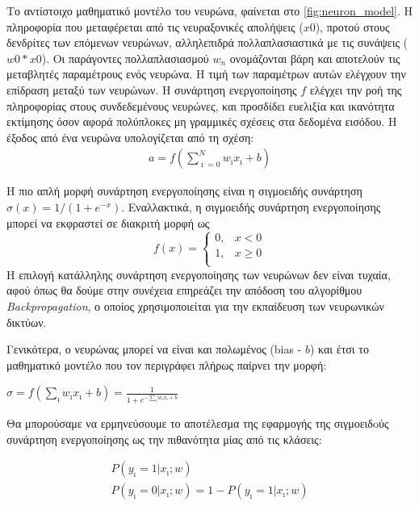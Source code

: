 Το αντίστοιχο μαθηματικό μοντέλο του νευρώνα, φαίνεται στο \autoref{fig:neuron_model}.
Η πληροφορία που μεταφέρεται από τις νευραξονικές απολήψεις ($x0$), προτού
στους δενδρίτες των επόμενων νευρώνων, αλληλεπιδρά πολλαπλασιαστικά με τις
συνάψεις ($w0*x0$). Οι παράγοντες πολλαπλασιασμού $w_n$ ονομάζονται βάρη
και αποτελούν τις μεταβλητές παραμέτρους ενός νευρώνα. Η τιμή των παραμέτρων
αυτών ελέγχουν την επίδραση μεταξύ των νευρώνων. Η συνάρτηση ενεργοποίησης $f$
ελέγχει την ροή της πληροφορίας στους συνδεδεμένους νευρώνες,
και προσδίδει ευελιξία και ικανότητα εκτίμησης όσον αφορά πολύπλοκες μη γραμμικές
σχέσεις στα δεδομένα εισόδου. Η έξοδος από ένα νευρώνα υπολογίζεται από τη σχέση:
\begin{gather*}
  a = f(\sum_{\imath=0}^{N}w_{\imath}x_{\imath} + b)
\end{gather*}

Η πιο απλή μορφή συνάρτηση ενεργοποίησης
είναι η σιγμοειδής συνάρτηση $\sigma(x) = 1 / (1 + e^{-x})$.
Εναλλακτικά, η σιγμοειδής συνάρτηση ενεργοποίησης μπορεί να εκφραστεί σε διακριτή μορφή ως
\[
f(x) =
  \begin{cases}
    0, & x < 0 \\
    1, & x \geq 0 \\
  \end{cases}
\]
Η επιλογή κατάλληλης συνάρτηση ενεργοποίησης των
νευρώνων δεν είναι τυχαία, αφού όπως θα δούμε στην
συνέχεια επηρεάζει την απόδοση του αλγορίθμου \emph{Backpropagation}, ο οποίος
χρησιμοποιείται για την εκπαίδευση των νευρωνικών δικτύων.

Γενικότερα, ο νευρώνας μπορεί να είναι και πολωμένος (bias - $b$) και έτσι το μαθηματικό
μοντέλο που τον περιγράφει πλήρως παίρνει την μορφή:
\begin{center}
\begin{large}
  $\sigma = f(\sum_{\imath}w_{\imath}x_{\imath} + b) = \frac{1}{1 + e^{-\sum_{\imath}w_{\imath}x_{\imath} + b}}$
\end{large}
\end{center}
Θα μπορούσαμε να ερμηνεύσουμε το αποτέλεσμα της εφαρμογής της
σιγμοειδoύς συνάρτηση ενεργοποίησης ως την πιθανότητα μίας από τις κλάσεις:
\begin{large}
\begin{gather*}
  P(y_{\imath} = 1 | x_{\imath};w) \\
  P(y_{\imath} = 0 | x_{\imath};w) = 1 - P(y_{\imath} = 1 | x_{\imath};w)
\end{gather*}
\end{large}

